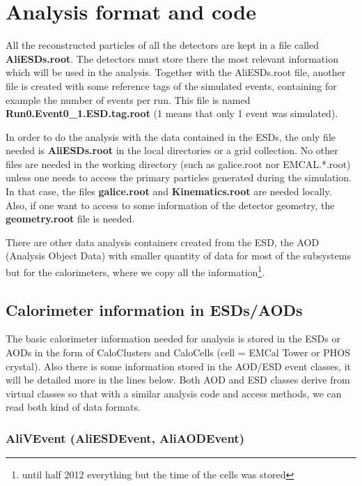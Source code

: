 \section{Analysis format and code}

All the reconstructed particles of all the detectors are kept
in a file called \textbf{AliESDs.root}. The detectors must store there
the most relevant information which will be used in the analysis. 
Together with the AliESDs.root file, another file is created with some reference tags of the simulated events, containing for example the number of events per run. This file is
named \textbf{Run0.Event0\_1.ESD.tag.root} (1 means that only 1 event
was simulated). 

In order to do the analysis with the data contained in the ESDs, the only file needed is \textbf{AliESDs.root} in the local directories or a grid collection. No other files are needed in the working directory (such as galice.root nor EMCAL.{*}.root) unless one needs to access the primary particles generated during the simulation. In that case, the files \textbf{galice.root} and \textbf{Kinematics.root} are needed locally.  Also, if one want to access to some information of the detector geometry, the \textbf{geometry.root} file is needed.

There are other data analysis containers created from the ESD, the
AOD (Analysis Object Data) with smaller quantity of data for most of the subsystems but for the calorimeters, where we copy all the information\footnote{until half 2012 everything but the time of the cells was stored}.


\subsection{Calorimeter information in ESDs/AODs}

The basic calorimeter information needed for analysis is stored in the ESDs or AODs in the form of CaloClusters and CaloCells (cell = EMCal Tower or PHOS crystal). Also there is some information stored in the AOD/ESD event classes, it will be detailed more in the lines below. Both AOD and ESD classes derive from virtual classes so that with a similar analysis code and access methods, we can read both kind of data formats.


\subsubsection{AliVEvent (AliESDEvent, AliAODEvent)}

